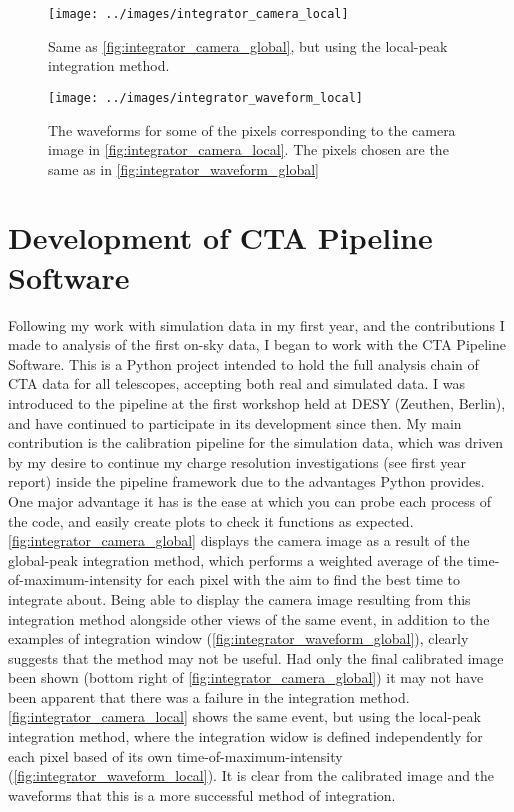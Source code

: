 \documentclass[%
amsmath,amssymb,
onecolumn,
a4paper,
10pt
]{article}%
\begin{document}
	\begin{figure}[H]
		\centering
		\texttt{[image: ../images/integrator\_camera\_local]}
		\caption{\label{fig:integrator_camera_local} Same as \autoref{fig:integrator_camera_global}, but using the local-peak integration method.}
	\end{figure}
	
	\begin{figure}[H]
		\centering
		\texttt{[image: ../images/integrator\_waveform\_local]}
		\caption{\label{fig:integrator_waveform_local} The waveforms for some of the pixels corresponding to the camera image in \autoref{fig:integrator_camera_local}. The pixels chosen are the same as in \autoref{fig:integrator_waveform_global}}
	\end{figure}
	
	\newpage
	
	\section{Development of CTA Pipeline Software}
	
	Following my work with simulation data in my first year, and the contributions I made to analysis of the first on-sky data, I began to work with the CTA Pipeline Software. This is a Python project intended to hold the full analysis chain of CTA data for all telescopes, accepting both real and simulated data. I was introduced to the pipeline at the first workshop held at DESY (Zeuthen, Berlin), and have continued to participate in its development since then. My main contribution is the calibration pipeline for the simulation data, which was driven by my desire to continue my charge resolution investigations (see first year report) inside the pipeline framework due to the advantages Python provides. One major advantage it has is the ease at which you can probe each process of the code, and easily create plots to check it functions as expected. \autoref{fig:integrator_camera_global} displays the camera image as a result of the global-peak integration method, which performs a weighted average of the time-of-maximum-intensity for each pixel with the aim to find the best time to integrate about. Being able to display the camera image resulting from this integration method alongside other views of the same event, in addition to the examples of integration window (\autoref{fig:integrator_waveform_global}), clearly suggests that the method may not be useful. Had only the final calibrated image been shown (bottom right of \autoref{fig:integrator_camera_global}) it may not have been apparent that there was a failure in the integration method. \autoref{fig:integrator_camera_local} shows the same event, but using the local-peak integration method, where the integration widow is defined independently for each pixel based of its own time-of-maximum-intensity (\autoref{fig:integrator_waveform_local}). It is clear from the calibrated image and the waveforms that this is a more successful method of integration.
		
\end{document}
